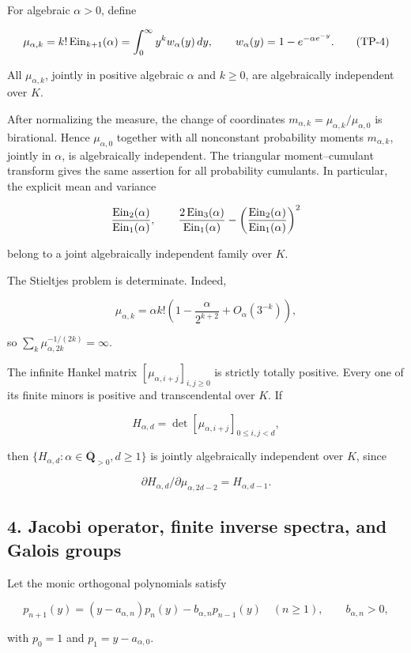 For algebraic \(\alpha>0\), define

\[
\mu_{\alpha,k}=k!\operatorname{Ein}_{k+1}(\alpha)
=\int_0^\infty y^k w_\alpha(y)\,dy,
\qquad w_\alpha(y)=1-e^{-\alpha e^{-y}}. \tag{TP-4}
\]

All \(\mu_{\alpha,k}\), jointly in positive algebraic \(\alpha\) and
\(k\ge0\), are algebraically independent over \(K\).

After normalizing the measure, the change of coordinates
\(m_{\alpha,k}=\mu_{\alpha,k}/\mu_{\alpha,0}\) is birational. Hence
\(\mu_{\alpha,0}\) together with all nonconstant probability moments
\(m_{\alpha,k}\), jointly in \(\alpha\), is algebraically independent.
The triangular moment--cumulant transform gives the same assertion for all
probability cumulants. In particular, the explicit mean and variance

\[
\frac{\operatorname{Ein}_2(\alpha)}{\operatorname{Ein}_1(\alpha)},\qquad
\frac{2\operatorname{Ein}_3(\alpha)}{\operatorname{Ein}_1(\alpha)}
-\left(\frac{\operatorname{Ein}_2(\alpha)}{\operatorname{Ein}_1(\alpha)}\right)^2
\]

belong to a joint algebraically independent family over \(K\).

The Stieltjes problem is determinate. Indeed,

\[
\mu_{\alpha,k}=\alpha k!\left(1-\frac{\alpha}{2^{k+2}}
+O_\alpha(3^{-k})\right), \tag{TP-5}
\]

so \(\sum_k\mu_{\alpha,2k}^{-1/(2k)}=\infty\).

The infinite Hankel matrix \([\mu_{\alpha,i+j}]_{i,j\ge0}\) is strictly
totally positive. Every one of its finite minors is positive and
transcendental over \(K\). If

\[
H_{\alpha,d}=\det[\mu_{\alpha,i+j}]_{0\le i,j<d},
\]

then \(\{H_{\alpha,d}:\alpha\in\overline{\mathbf Q}_{>0},d\ge1\}\) is
jointly algebraically independent over \(K\), since

\[
\partial H_{\alpha,d}/\partial\mu_{\alpha,2d-2}=H_{\alpha,d-1}.
\]

\subsection{4. Jacobi operator, finite inverse spectra, and Galois groups}

Let the monic orthogonal polynomials satisfy

\[
p_{n+1}(y)=(y-a_{\alpha,n})p_n(y)-b_{\alpha,n}p_{n-1}(y)
\quad(n\ge1),\qquad b_{\alpha,n}>0,
\]

with \(p_0=1\) and \(p_1=y-a_{\alpha,0}\).

